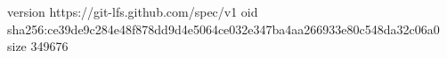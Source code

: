 version https://git-lfs.github.com/spec/v1
oid sha256:ce39de9c284e48f878dd9d4e5064ce032e347ba4aa266933e80c548da32c06a0
size 349676
